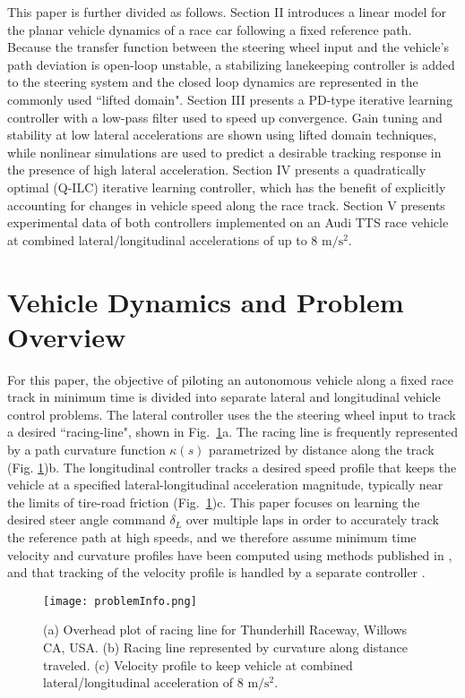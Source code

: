 \documentclass[letterpaper, 10 pt, conference]{ieeeconf}  %
\begin{document}
 This paper is further divided as follows. Section II introduces a linear model for the planar vehicle dynamics of a race car following a fixed reference path. Because the transfer function between
the steering wheel input and the vehicle's path deviation is open-loop unstable, a stabilizing lanekeeping controller is added to the steering system and the closed loop dynamics
are represented in the commonly used ``lifted domain". Section III presents a PD-type iterative learning controller with a low-pass filter used to speed
up convergence. Gain tuning and stability at low lateral accelerations are shown using lifted domain techniques, while nonlinear simulations are used to predict a desirable tracking response in the presence of
high lateral acceleration. Section IV presents a quadratically optimal (Q-ILC) iterative learning controller, which has the benefit of explicitly
accounting for changes in vehicle speed along the race track. Section V presents experimental data of both controllers implemented on an Audi TTS race vehicle at combined 
lateral/longitudinal accelerations of up to 8 $\mathrm{m/s^2}$.
 
\section{Vehicle Dynamics and Problem Overview}
\label{sec:problemDescription}

For this paper, the objective of piloting an autonomous vehicle along a fixed race track in minimum time is divided into separate lateral and longitudinal vehicle control problems. The lateral 
controller uses the the steering wheel input to track a desired ``racing-line", shown in 
Fig.~\ref{problemInfo}a. The racing line is frequently represented by a path curvature function $\kappa(s)$ parametrized by distance along the track (Fig. \ref{problemInfo})b. 
The longitudinal controller tracks a desired speed profile that keeps the vehicle at a specified lateral-longitudinal acceleration magnitude, typically near the limits of tire-road friction (Fig.~\ref{problemInfo})c. 
This paper focuses on learning the desired steer angle command $\delta_L$ over multiple laps in order to accurately track the reference path at high speeds, and we therefore assume minimum time 
velocity and curvature profiles have been computed using methods published in \cite{theodosis}, and that tracking of the velocity profile is handled by a separate controller \cite{mickthesis}. 

\begin{figure}[h]
\centering
\texttt{[image: problemInfo.png]}
\caption{(a) Overhead plot of racing line for Thunderhill Raceway, Willows CA, USA. (b) Racing line represented by curvature along distance traveled. (c) Velocity profile
to keep vehicle at combined lateral/longitudinal acceleration of 8 $\mathrm{m/s^2}$.}
\label{problemInfo}
\end{figure}
\end{document}
